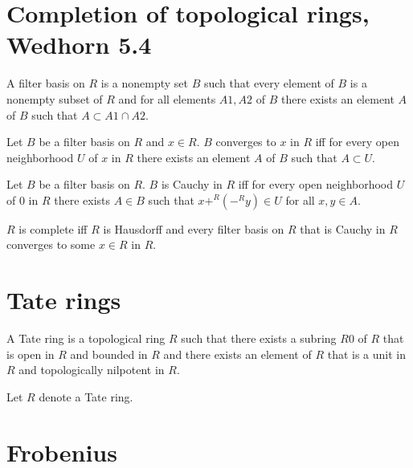 \documentclass{article}
\begin{document}
\section{Completion of topological rings, Wedhorn 5.4}

\begin{forthel}
  \begin{definition}
    A filter basis on $R$ is a nonempty set $B$ such that
    every element of $B$ is a nonempty subset of $R$ and for all elements $A1,A2$ of $B$
    there exists an element $A$ of $B$ such that  $A \subset A1 \cap A2$.
  \end{definition}

  \begin{definition}
    Let $B$ be a filter basis on $R$ and $x \in R$.
    $B$ converges to $x$ in $R$ iff for every open neighborhood $U$ of $x$ in $R$
    there exists an element $A$ of $B$ such that $A \subset U$.
  \end{definition}

  \begin{definition}
    Let $B$ be a filter basis on $R$.
    $B$ is Cauchy in $R$ iff for every open neighborhood $U$ of $0$ in $R$ there exists
    $A \in B$ such that $x +^{R} (-^{R} y) \in U$ for all $x,y \in A$.
  \end{definition}

  \begin{definition}
    $R$ is complete iff $R$ is Hausdorff and every filter basis on $R$ that is Cauchy in $R$
    converges to some $x \in R$ in $R$.
  \end{definition}
\end{forthel}


\section{Tate rings}

\begin{forthel}
  \begin{definition}
    A Tate ring is a topological ring $R$ such that
    there exists a subring $R0$ of $R$ that is open in $R$ and bounded in $R$
    and there exists an element of $R$ that is a unit in $R$
    and topologically nilpotent in $R$.
  \end{definition}

  Let $R$ denote a Tate ring.
\end{forthel}


\section{Frobenius}
\end{document}

